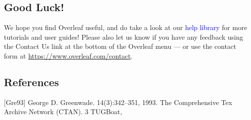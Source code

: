 \documentclass{article}
\begin{document}
\subsection{Good Luck!}

We hope you find Overleaf useful, and do take a look at our \textcolor{blue}{help library} for more tutorials and user
guides! Please also let us know if you have any feedback using the Contact Us link at the bottom of
the Overleaf menu — or use the contact form at \textcolor{blue}{ \href{https://www.overleaf.com/contact}{https://www.overleaf.com/contact}}.

\subsection*{References}
[Gre93] George D. Greenwade.
14(3):342–351, 1993.
The Comprehensive Tex Archive Network (CTAN).
3
TUGBoat,
\end{document}

